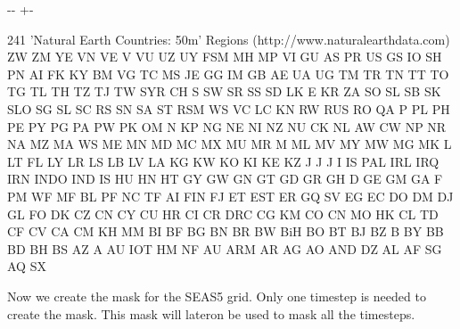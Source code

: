 \documentclass[letterpaper,10pt,english]{sphinxmanual}
\newlength\nbsphinxcodecellspacing
\begin{document}
{

\kern-\sphinxverbatimsmallskipamount\kern-\baselineskip
\kern+\FrameHeightAdjust\kern-\fboxrule
\vspace{\nbsphinxcodecellspacing}

\begin{sphinxVerbatim}[commandchars=\\\{\}]
\llap{\color{nbsphinxout}[62]:\,\hspace{\fboxrule}\hspace{\fboxsep}}241 'Natural Earth Countries: 50m' Regions (http://www.naturalearthdata.com)
ZW ZM YE VN VE V VU UZ UY FSM MH MP VI GU AS PR US GS IO SH PN AI FK KY BM VG TC MS JE GG IM GB AE UA UG TM TR TN TT TO TG TL TH TZ TJ TW SYR CH S SW SR SS SD LK E KR ZA SO SL SB SK SLO SG SL SC RS SN SA ST RSM WS VC LC KN RW RUS RO QA P PL PH PE PY PG PA PW PK OM N KP NG NE NI NZ NU CK NL AW CW NP NR NA MZ MA WS ME MN MD MC MX MU MR M ML MV MY MW MG MK L LT FL LY LR LS LB LV LA KG KW KO KI KE KZ J J J I IS PAL IRL IRQ IRN INDO IND IS HU HN HT GY GW GN GT GD GR GH D GE GM GA F PM WF MF BL PF NC TF AI FIN FJ ET EST ER GQ SV EG EC DO DM DJ GL FO DK CZ CN CY CU HR CI CR DRC CG KM CO CN MO HK CL TD CF CV CA CM KH MM BI BF BG BN BR BW BiH BO BT BJ BZ B BY BB BD BH BS AZ A AU IOT HM NF AU ARM AR AG AO AND DZ AL AF SG AQ SX
\end{sphinxVerbatim}
}

Now we create the mask for the SEAS5 grid. Only one timestep is needed to create the mask. This mask will lateron be used to mask all the timesteps.

{
\begin{sphinxVerbatim}[commandchars=\\\{\}]
\llap{\color{nbsphinxin}[63]:\,\hspace{\fboxrule}\hspace{\fboxsep}}    
\end{sphinxVerbatim}
}
\end{document}
